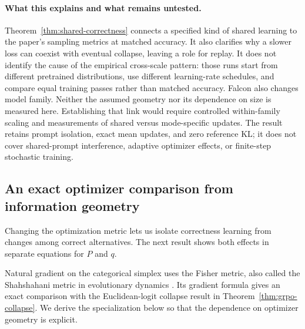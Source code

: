 \documentclass{article}
\newcommand{\1}{\mathbf 1}
\theoremstyle{remark}
\theoremstyle{definition}
\theoremstyle{plain}
\begin{document}
\paragraph{What this explains and what remains untested.}
Theorem~\ref{thm:shared-correctness} connects a specified kind of shared
learning to the paper's sampling metrics at matched accuracy. It also
clarifies why a slower loss can coexist with eventual collapse, leaving a
role for replay. It does not identify the cause of the empirical cross-scale
pattern: those runs start from different pretrained distributions, use
different learning-rate schedules, and compare equal training passes rather
than matched accuracy. Falcon also changes model family. Neither the assumed
geometry nor its dependence on size is measured here. Establishing that link
would require controlled within-family scaling and measurements of shared
versus mode-specific updates. The result retains prompt isolation, exact
mean updates, and zero reference KL; it does not cover shared-prompt
interference, adaptive optimizer effects, or finite-step stochastic training.

\subsection{An exact optimizer comparison from information geometry}
\label{app:theory-natural-gradient}

Changing the optimization metric lets us isolate correctness learning from
changes among correct alternatives. The next result shows both effects in
separate equations for $P$ and $q$.


Natural gradient on the categorical simplex uses the Fisher metric, also
called the Shahshahani metric in evolutionary dynamics
\citep[Sections~2.3 and~3.1]{harper2009informationgeometry}. Its gradient
formula gives an exact comparison with the Euclidean-logit collapse result
in Theorem~\ref{thm:grpo-collapse}. We derive the specialization below so
that the dependence on optimizer geometry is explicit.
\end{document}
